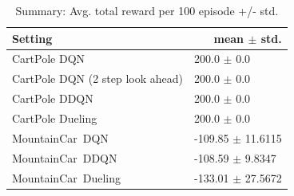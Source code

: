 \documentclass[12pt]{article}
\begin{document}
    \begin{tcolorbox}[fit,height=22cm, width=\textwidth, blank, borderline={1pt}{-2pt},nobeforeafter]
        \begin{table}[H]
    	\centering
    	\caption{ Summary: Avg. total reward per 100 episode +/- std.}
    	\begin{tabular}{|p{9.43em}|r|}
    		\hline
    		\textbf{\small Setting} & \multicolumn{1}{p{10.645em}|}{\textbf{ \small mean $\pm$ std.}} \\
    		\hline
    		{\small CartPole DQN} & \multicolumn{1}{l|}{200.0 $\pm$ 0.0} \\
    		\hline
    		{\small CartPole DQN} \newline{} {\small(2 step look ahead)} & \multicolumn{1}{l|}{200.0 $\pm$ 0.0} \\
    		\hline
    		{\small CartPole DDQN} & \multicolumn{1}{l|}{200.0 $\pm$ 0.0} \\
    		\hline
    		{\small CartPole Dueling} & \multicolumn{1}{l|}{200.0 $\pm$ 0.0} \\
    		\hline
    		{\small MountainCar DQN} & \multicolumn{1}{l|}{-109.85 $\pm$ 11.6115} \\
    		\hline
    		{\small MountainCar DDQN} & \multicolumn{1}{l|}{-108.59 $\pm$ 9.8347} \\
    		\hline
    		{\small MountainCar Dueling} & \multicolumn{1}{l|}{-133.01 $\pm$ 27.5672} \\
    		\hline
    	\end{tabular}%
    	\label{tab5}%
    \end{table}%
    \end{tcolorbox}
\end{document}
